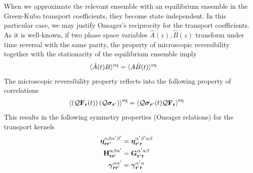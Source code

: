 \documentclass[b5paper,openright,11pt]{book}
\begin{document}
When we approximate the relevant ensemble with an equilibrium ensemble
in   the  Green-Kubo   transport  coefficients,   they  become   state
independent.  In  this  particular  case,  we  may  justify  Onsager's
reciprocity for the  transport coefficients.  As it  is well-known, if
two phase space variables $\hat{A}(z),\hat{B}(z)$ transform under time
reversal   with  the   same  parity,   the  property   of  microscopic
reversibility  together  with  the  stationarity  of  the  equilibrium
ensemble imply
\begin{align}
  \langle \hat{A}(t)B\rangle^{\rm eq}&=  \langle A\hat{B}(t)\rangle^{\rm eq}
\end{align}
The microscopic reversibility
property reflects into the following  property of correlations
\begin{align}
\left\langle \left({\cal Q}{\bf F}_{\bf r}(t)\right)\left({\cal Q} \boldsymbol{\sigma}_{{\bf r}'}\right)\right\rangle^{\rm eq}=
  \left\langle {\cal Q} \boldsymbol{\sigma}_{{\bf r}'}(t){\cal Q}{\bf F}_{{\bf r}}\right\rangle^{\rm eq}
\end{align}
This results in the  following symmetry properties (Onsager relations)
for the transport kernels
\begin{align}
  \boldsymbol{\eta}^{\alpha\beta\alpha'\beta'}_{{\bf  r}{\bf r}'} &=
  \boldsymbol{\eta}^{\alpha'\beta'\alpha\beta}_{{\bf r}'{\bf  r}}
\nonumber\\
{\bf H}^{\alpha\beta\alpha'}_{{\bf r}{\bf r}'}&={\bf G}^{\alpha'\alpha\beta}_{{\bf r}'{\bf  r}}
\nonumber\\
\boldsymbol{\gamma}^{\alpha\alpha'}_{{\bf  r}{\bf r}'}&=\boldsymbol{\gamma}^{\alpha'\alpha}_{{\bf r}'{\bf  r}}
\label{GKsymmetries}
\end{align}
\end{document}
